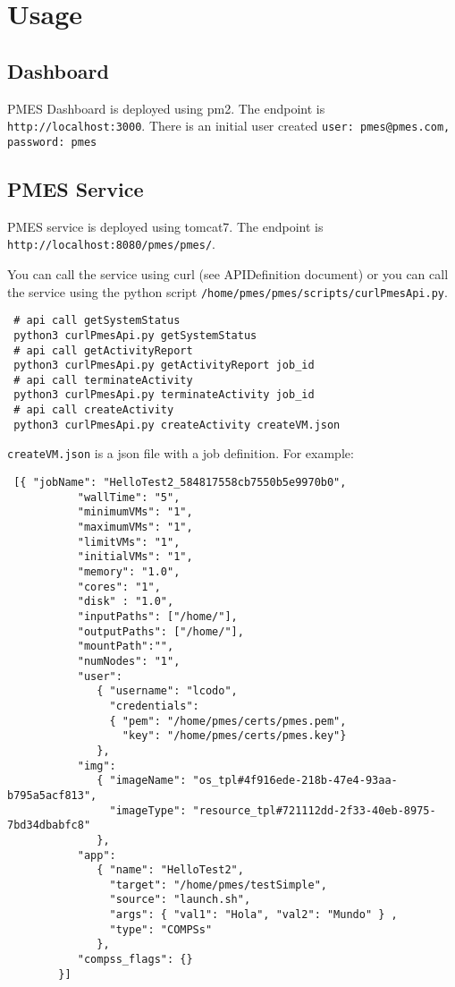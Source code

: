 \documentclass[a4paper,10pt]{article}
\begin{document}
\section{Usage}
\subsection{Dashboard}
PMES Dashboard is  deployed using pm2. The endpoint is \texttt{http://localhost:3000}. There is an initial user created \texttt{user: pmes@pmes.com, password: pmes}

\subsection{PMES Service}
PMES service is  deployed using tomcat7. The endpoint is \texttt{http://localhost:8080/pmes/pmes/}.

You can call the service using curl (see APIDefinition document) or you can call the service using the python script \texttt{/home/pmes/pmes/scripts/curlPmesApi.py}.

\begin{verbatim}
 # api call getSystemStatus
 python3 curlPmesApi.py getSystemStatus
 # api call getActivityReport
 python3 curlPmesApi.py getActivityReport job_id
 # api call terminateActivity
 python3 curlPmesApi.py terminateActivity job_id
 # api call createActivity
 python3 curlPmesApi.py createActivity createVM.json
\end{verbatim}

\texttt{createVM.json} is a json file with a job definition. For example:
\begin{verbatim}
 [{ "jobName": "HelloTest2_584817558cb7550b5e9970b0",
           "wallTime": "5",
           "minimumVMs": "1",
           "maximumVMs": "1",
           "limitVMs": "1",
           "initialVMs": "1",
           "memory": "1.0",
           "cores": "1",
           "disk" : "1.0",
           "inputPaths": ["/home/"],
           "outputPaths": ["/home/"],
           "mountPath":"",
           "numNodes": "1",
           "user":
              { "username": "lcodo",
                "credentials":
                { "pem": "/home/pmes/certs/pmes.pem",
                  "key": "/home/pmes/certs/pmes.key"}
              },
           "img": 
              { "imageName": "os_tpl#4f916ede-218b-47e4-93aa-b795a5acf813", 
                "imageType": "resource_tpl#721112dd-2f33-40eb-8975-7bd34dbabfc8"
              },
           "app":
              { "name": "HelloTest2",
                "target": "/home/pmes/testSimple",
                "source": "launch.sh",
                "args": { "val1": "Hola", "val2": "Mundo" } ,
                "type": "COMPSs"
              },
           "compss_flags": {}
        }]
\end{verbatim}
\end{document}
